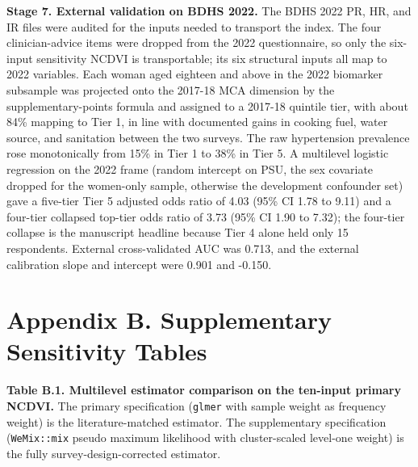 \documentclass[
  12pt,
  a4paper]{article}
\begin{document}
\textbf{Stage 7. External validation on BDHS 2022.} The BDHS 2022 PR, HR, and IR files were audited for the inputs needed to transport the index. The four clinician-advice items were dropped from the 2022 questionnaire, so only the six-input sensitivity NCDVI is transportable; its six structural inputs all map to 2022 variables. Each woman aged eighteen and above in the 2022 biomarker subsample was projected onto the 2017-18 MCA dimension by the supplementary-points formula and assigned to a 2017-18 quintile tier, with about 84\% mapping to Tier 1, in line with documented gains in cooking fuel, water source, and sanitation between the two surveys. The raw hypertension prevalence rose monotonically from 15\% in Tier 1 to 38\% in Tier 5. A multilevel logistic regression on the 2022 frame (random intercept on PSU, the sex covariate dropped for the women-only sample, otherwise the development confounder set) gave a five-tier Tier 5 adjusted odds ratio of 4.03 (95\% CI 1.78 to 9.11) and a four-tier collapsed top-tier odds ratio of 3.73 (95\% CI 1.90 to 7.32); the four-tier collapse is the manuscript headline because Tier 4 alone held only 15 respondents. External cross-validated AUC was 0.713, and the external calibration slope and intercept were 0.901 and -0.150.

\section*{Appendix B. Supplementary Sensitivity Tables}\label{appendix-b.-supplementary-sensitivity-tables}

\textbf{Table B.1. Multilevel estimator comparison on the ten-input primary NCDVI.} The primary specification (\texttt{glmer} with sample weight as frequency weight) is the literature-matched estimator. The supplementary specification (\texttt{WeMix::mix} pseudo maximum likelihood with cluster-scaled level-one weight) is the fully survey-design-corrected estimator.
\end{document}
